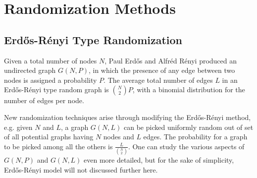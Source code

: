 \section{Randomization Methods}





\subsection{Erd\H{o}s-R\'{e}nyi Type Randomization}

Given a total number of nodes $N$, Paul Erd\H{o}s and Alfr\'{e}d R\'{e}nyi produced an undirected graph $G(N,P)$, in which the presence of any edge between two nodes is assigned a probability $P$. 
The average total number of edges $L$ in an  Erd\H{o}s-R\'{e}nyi type random graph is $\binom {N} {2}P$, with a binomial distribution for the number of edges per node.

New randomization techniques arise through modifying the Erd\H{o}s-R\'{e}nyi method, e.g. given $N$ and $L$, a graph $G(N,L)$ can be picked uniformly random out of set of all potential graphs having $N$ nodes and $L$ edges. The probability for a graph to be picked among all the others is $\frac{L}{\binom {N}{2}}  $. One can study the various aspects of $G(N,P)$ and $G(N,L)$ even more detailed, but for the sake of simplicity, Erd\H{o}s-R\'{e}nyi model will not discussed further here.

